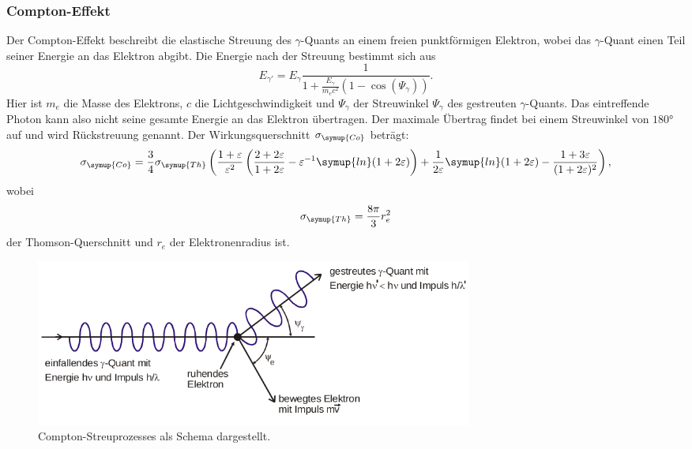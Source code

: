 \subsubsection{Compton-Effekt}
Der Compton-Effekt beschreibt die elastische Streuung des $\gamma$-Quants an einem freien punktförmigen Elektron, wobei das $\gamma$-Quant einen Teil seiner Energie an das Elektron abgibt.
Die Energie nach der Streuung bestimmt sich aus
\begin{equation}
E_{\gamma'}=E_{\gamma}\frac{1}{1+\frac{E_{\gamma}}{m_e c^2}(1-\cos(\Psi_{\gamma}))}.
\end{equation}
Hier ist $m_e$ die Masse des Elektrons, $c$ die Lichtgeschwindigkeit und $\Psi_{\gamma}$ der Streuwinkel $\Psi_{\gamma}$ des gestreuten $\gamma$-Quants.
Das eintreffende Photon kann also nicht seine gesamte Energie an das Elektron übertragen.
Der maximale Übertrag findet bei einem Streuwinkel von $180°$ auf und wird Rückstreuung genannt.
Der Wirkungsquerschnitt $\sigma_{\symup{Co}}$ beträgt:
\begin{align*}
      \sigma_{\symup{Co}} = \frac{3}{4}\sigma_{\symup{Th}}\left(\frac{1+\varepsilon}{\varepsilon^2}\left(\frac{2+2\varepsilon}{1+2\varepsilon}-\varepsilon^{-1}\symup{ln}(1+2\varepsilon)\right)
      + \frac{1}{2\varepsilon}\symup{ln}(1+2\varepsilon) - \frac{1+3\varepsilon}{(1+2\varepsilon)^2}\right),
\end{align*}
wobei 
\begin{equation*}
\sigma_{\symup{Th}} =\frac{8\pi}{3}r_e^2
\end{equation*}
der Thomson-Querschnitt und $r_e$ der Elektronenradius ist.

 \begin{figure}
   \centering
   \includegraphics[height=5.5cm]{content/Compton.png}
   \caption{Compton-Streuprozesses als Schema dargestellt.\cite{V18}}
   \label{fig:Compton}
 \end{figure}

